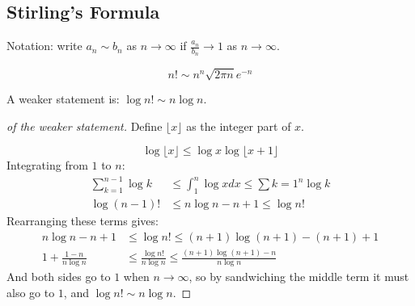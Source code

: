 \documentclass[../Main.tex]{subfiles}
\begin{document}
\subsection{Stirling's Formula}
Notation: write $a_n \sim b_n$ as $n \to \infty$ if $\frac{a_n}{b_n} \to 1$ as $n \to \infty$.
\begin{theorem}
    \begin{equation}
        n! \sim n^n \sqrt{2\pi n} e^{-n}
        \label{eqnStirlingFormula}
    \end{equation}
\end{theorem}
A weaker statement is: $\log{n!} \sim n \log{n}$.
\begin{proof}[of the weaker statement]
    Define $\lfloor x \rfloor$ as the integer part of $x$.\par
    \begin{equation*}
        \log{\lfloor x \rfloor} \leq \log{x} \log{\lfloor x + 1 \rfloor}
    \end{equation*}
    Integrating from $1$ to $n$:
    \begin{align*}
        \sum_{k=1}^{n-1} \log{k} &\leq \int_{1}^{n} \log{x} dx \leq \sum{k=1}^{n} \log{k} \\
        \log{(n-1)!} &\leq n \log{n} - n + 1 \leq \log{n!}
    \end{align*}
    Rearranging these terms gives:
    \begin{align*}
        n \log{n} - n + 1 &\leq \log{n!} \leq (n + 1) \log{(n + 1)} - (n+1) + 1 \\
        1 + \frac{1 - n}{n\log{n}} &\leq \frac{\log{n!}}{n\log{n}} \leq \frac{(n+1)\log{(n+1)} - n}{n\log{n}}
    \end{align*}
    And both sides go to $1$ when $n \to \infty$, so by sandwiching the middle term it must also go to $1$, and $\log{n!} \sim n \log{n}$.
\end{proof}
\end{document}
